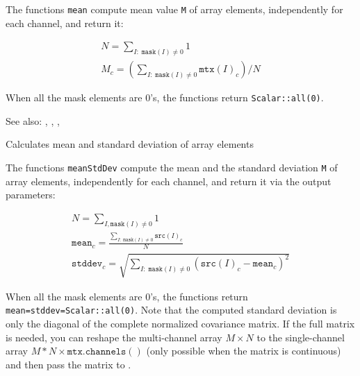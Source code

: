 The functions \texttt{mean} compute mean value \texttt{M} of array elements, independently for each channel, and return it:

\[
\begin{array}{l}
N = \sum_{I:\;\texttt{mask}(I)\ne 0} 1\\
M_c = \left(\sum_{I:\;\texttt{mask}(I)\ne 0}{\texttt{mtx}(I)_c}\right)/N
\end{array}
\]

When all the mask elements are 0's, the functions return \texttt{Scalar::all(0)}.

See also: , , , 

Calculates mean and standard deviation of array elements

\begin{description}
\end{description}

The functions \texttt{meanStdDev} compute the mean and the standard deviation \texttt{M} of array elements, independently for each channel, and return it via the output parameters:

\[
\begin{array}{l}
N = \sum_{I, \texttt{mask}(I) \ne 0} 1\\
\texttt{mean}_c = \frac{\sum_{ I: \; \texttt{mask}(I) \ne 0} \texttt{src}(I)_c}{N}\\
\texttt{stddev}_c = \sqrt{\sum_{ I: \; \texttt{mask}(I) \ne 0} \left(\texttt{src}(I)_c - \texttt{mean}_c\right)^2}
\end{array}
\]

When all the mask elements are 0's, the functions return \texttt{mean=stddev=Scalar::all(0)}.
Note that the computed standard deviation is only the diagonal of the complete normalized covariance matrix. If the full matrix is needed, you can reshape the multi-channel array $M \times N$ to the single-channel array $M*N \times \texttt{mtx.channels}()$ (only possible when the matrix is continuous) and then pass the matrix to .

